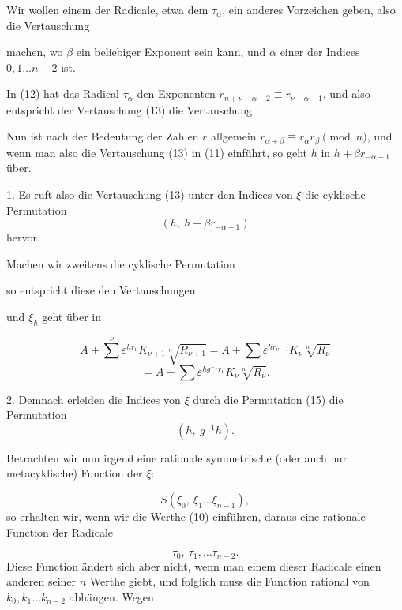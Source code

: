 Wir wollen einem der Radicale, etwa dem $\tau_\alpha$, ein anderes Vorzeichen geben, also die Vertauschung

machen, wo $\beta$ ein beliebiger Exponent sein kann, und $\alpha$ einer der Indices $0, 1 \ldots n-2$ ist.

In (12) hat das Radical $\tau_\alpha$ den Exponenten $r_{n+\nu-\alpha-2} \equiv r_{\nu-\alpha-1}$, und also entspricht der Vertauschung (13) die Vertauschung

Nun ist nach der Bedeutung der Zahlen $r$ allgemein $r_{\alpha+\beta} \equiv r_\alpha r_\beta \pmod{n}$, und wenn man also die Vertauschung (13) in (11) einführt, so geht $h$ in $h + \beta r_{-\alpha-1}$ über.

1. Es ruft also die Vertauschung (13) unter den Indices von $\xi$ die cyklische Permutation
\[
(h,\ h + \beta r_{-\alpha-1})
\]
hervor.

Machen wir zweitens die cyklische Permutation

so entspricht diese den Vertauschungen

und $\xi_h$ geht über in

\[
A + \sum^{\nu} \varepsilon^{h r_\nu} K_{\nu+1} \sqrt[n]{R_{\nu+1}} = A + \sum \varepsilon^{h r_{\nu-1}} K_\nu \sqrt[n]{R_\nu}
\]
\[
= A + \sum \varepsilon^{h g^{-1} r_\nu} K_\nu \sqrt[n]{R_\nu}.
\]

2. Demnach erleiden die Indices von $\xi$ durch die Permutation (15) die Permutation
\[
(h,\ g^{-1} h).
\]

Betrachten wir nun irgend eine rationale symmetrische (oder auch nur metacyklische) Function der $\xi$:

\[
S(\xi_0,\ \xi_1 \ldots \xi_{n-1}),
\]
so erhalten wir, wenn wir die Werthe (10) einführen, daraus eine rationale Function der Radicale

\[
\tau_0,\ \tau_1, \ldots \tau_{n-2}.
\]
Diese Function ändert sich aber nicht, wenn man einem dieser Radicale einen anderen seiner $n$ Werthe giebt, und folglich muss die Function rational von $k_0, k_1 \ldots k_{n-2}$ abhängen. Wegen
